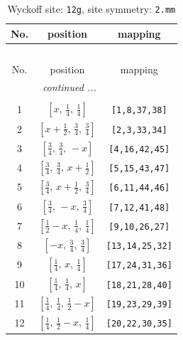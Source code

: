 \documentclass[fleqn,8pt]{jsarticle}
\begin{document}
\begin{longtable}{ccc}
\caption{Wyckoff site: {\tt 12g}, site symmetry: {\tt 2.mm}}
 \\
 \hline \hline
No. & position & mapping \\ \hline \endfirsthead

\multicolumn{2}{l}{\tablename\ \thetable{}} \\
 \hline \hline
No. & position & mapping \\ \hline \endhead

 \hline \hline
\multicolumn{2}{r}{\footnotesize\it continued ...} \\ \endfoot

 \hline \hline
\multicolumn{2}{r}{} \\ \endlastfoot

1 & $\left[ x,\, \frac{1}{4},\, \frac{1}{4} \right]$ & {\tt [1,8,37,38]} \\ \hline
2 & $\left[ x + \frac{1}{2},\, \frac{3}{4},\, \frac{3}{4} \right]$ & {\tt [2,3,33,34]} \\ \hline
3 & $\left[ \frac{3}{4},\, \frac{3}{4},\, - x \right]$ & {\tt [4,16,42,45]} \\ \hline
4 & $\left[ \frac{3}{4},\, \frac{3}{4},\, x + \frac{1}{2} \right]$ & {\tt [5,15,43,47]} \\ \hline
5 & $\left[ \frac{3}{4},\, x + \frac{1}{2},\, \frac{3}{4} \right]$ & {\tt [6,11,44,46]} \\ \hline
6 & $\left[ \frac{3}{4},\, - x,\, \frac{3}{4} \right]$ & {\tt [7,12,41,48]} \\ \hline
7 & $\left[ \frac{1}{2} - x,\, \frac{1}{4},\, \frac{1}{4} \right]$ & {\tt [9,10,26,27]} \\ \hline
8 & $\left[ - x,\, \frac{3}{4},\, \frac{3}{4} \right]$ & {\tt [13,14,25,32]} \\ \hline
9 & $\left[ \frac{1}{4},\, x,\, \frac{1}{4} \right]$ & {\tt [17,24,31,36]} \\ \hline
10 & $\left[ \frac{1}{4},\, \frac{1}{4},\, x \right]$ & {\tt [18,21,28,40]} \\ \hline
11 & $\left[ \frac{1}{4},\, \frac{1}{4},\, \frac{1}{2} - x \right]$ & {\tt [19,23,29,39]} \\ \hline
12 & $\left[ \frac{1}{4},\, \frac{1}{2} - x,\, \frac{1}{4} \right]$ & {\tt [20,22,30,35]} \\
\end{longtable}
\renewcommand{\arraystretch}{1.2}
\end{document}
